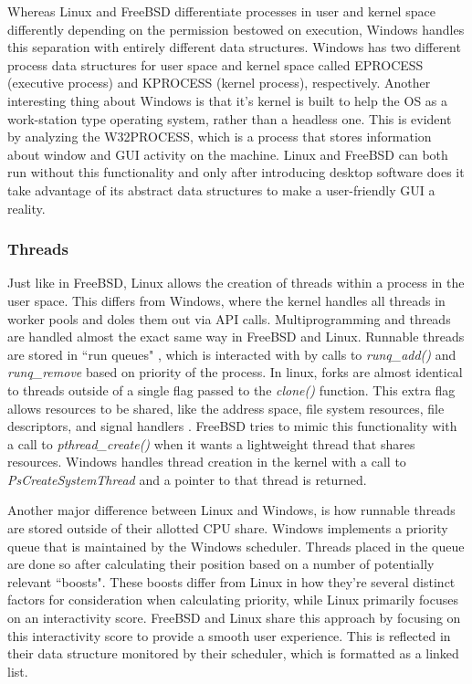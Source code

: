 \documentclass[10pt,draftclsnofoot,onecolumn]{IEEEtran}
\begin{document}
\par Whereas Linux and FreeBSD differentiate processes in user and kernel space differently depending on the permission bestowed on execution, Windows handles this separation with entirely different data structures.
Windows has two different process data structures for user space and kernel space called EPROCESS (executive process) and KPROCESS (kernel process), respectively.
Another interesting thing about Windows is that it's kernel is built to help the OS as a work-station type operating system, rather than a headless one.
This is evident by analyzing the W32PROCESS, which is a process that stores information about window and GUI activity on the machine.
Linux and FreeBSD can both run without this functionality and only after introducing desktop software does it take advantage of its abstract data structures to make a user-friendly GUI a reality.\\

\subsubsection{Threads}
\label{sub:Threads Linux}
\par Just like in FreeBSD, Linux allows the creation of threads within a process in the user space.
This differs from Windows, where the kernel handles all threads in worker pools and doles them out via API calls.
Multiprogramming and threads are handled almost the exact same way in FreeBSD and Linux.
Runnable threads are stored in ``run queues" \cite{bsd:1} \cite{linux:1}, which is interacted with by calls to \textit{runq\_add()} and \textit{runq\_remove} based on priority of the process.
In linux, forks are almost identical to threads outside of a single flag passed to the \textit{clone()} function.
This extra flag allows resources to be shared, like the address space, file system resources, file descriptors, and signal handlers \cite{linux:1}.
FreeBSD tries to mimic this functionality with a call to \textit{pthread\_create()} when it wants a lightweight thread that shares resources.
Windows handles thread creation in the kernel with a call to \textit{PsCreateSystemThread} and a pointer to that thread is returned.

\par Another major difference between Linux and Windows, is how runnable threads are stored outside of their allotted CPU share.
Windows implements a priority queue that is maintained by the Windows scheduler.
Threads placed in the queue are done so after calculating their position based on a number of potentially relevant ``boosts".
These boosts differ from Linux in how they're several distinct factors for consideration when calculating priority, while Linux primarily focuses on an interactivity score.
FreeBSD and Linux share this approach by focusing on this interactivity score to provide a smooth user experience.
This is reflected in their data structure monitored by their scheduler, which is formatted as a linked list.\\
\end{document}

